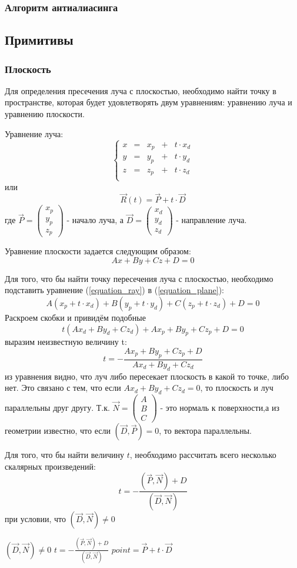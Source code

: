 \documentclass[12pt, a4paper]{article}
\def\VEC#1#2#3{\left( \begin{array}{c} #1 \\ #2 \\ #3 \end{array} \right) }
\def\VECXYZ#1{\left( \begin{array}{c} x_#1 \\ y_#1 \\ z_#1 \end{array} \right) }
\begin{document}
\subsubsection{Алгоритм антиалиасинга}

\subsection{Примитивы}
\subsubsection{Плоскость}
Для определения пресечения луча с плоскостью, необходимо найти точку в пространстве, которая будет удовлетворять двум уравнениям: уравнению луча и уравнению плоскости.
\par
Уравнение луча:
\begin{equation}
\left\{
\begin{array}{ccccc}
x & = & x_p & + & t \cdot x_d \\
y & = & y_p & + & t \cdot y_d \\
z & = & z_p & + & t \cdot z_d \\
\end{array}
\right.
\label{equation_ray}
\end{equation}
или
$$
\vec{R}(t) = \vec{P} + t \cdot \vec{D}
$$
где $\vec{P} = \VECXYZ{p} $ - начало луча, а $\vec{D} = \VECXYZ{d} $ - направление луча. 
\par
Уравнение плоскости задается следующим образом:
\begin{equation}
Ax + By + Cz + D = 0
\label{equation_plane}
\end{equation}
\par
Для того, что бы найти точку пересечения луча с плоскостью, необходимо подставить уравнение (\ref{equation_ray}) в (\ref{equation_plane}):
$$
A(x_p + t \cdot x_d) + B(y_p + t \cdot y_d) + C(z_p + t \cdot z_d) + D = 0
$$
Раскроем скобки и привидём подобные
$$
t(Ax_d + By_d + Cz_d ) + Ax_p + By_p + Cz_p + D = 0
$$
выразим неизвестную величину t:
$$
 t = - \frac{Ax_p + By_p + Cz_p + D}{Ax_d + By_d + Cz_d}
$$
из уравнения видно, что луч либо пересекает плоскость в какой то точке, либо нет. Это связано с тем, что если $Ax_d + By_d + Cz_d = 0$, то плоскость и луч параллельны друг другу. Т.к. $\vec{N} = \VEC{A}{B}{C} $ - это нормаль к поверхности,а из геометрии известно, что если $( \vec{D} , \vec{P} ) = 0$, то вектора параллельны.
\par
   Для того, что бы найти величину $t$, необходимо рассчитать всего несколько скалярных произведений:
$$
t = - \frac{(\vec{P}, \vec{N}) + D}{(\vec{D}, \vec{N})}
$$
при условии, что $(\vec{D}, \vec{N}) \neq 0$
\begin{codebox}
\li \If $(\vec{D}, \vec{N}) \neq 0$
\li \Then $ t = - \displaystyle\frac{(\vec{P}, \vec{N}) + D}{(\vec{D}, \vec{N})} $
\li $point = \vec{P} + t \cdot \vec{D}$
\end{codebox}
\end{document}
